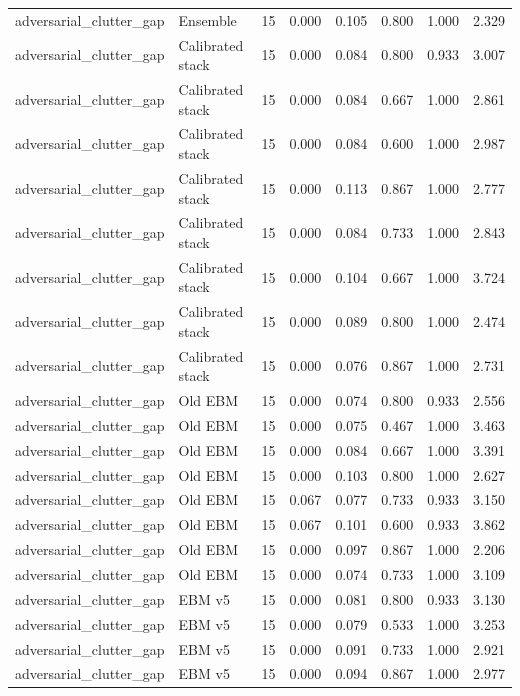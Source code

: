 {\begin{longtable}{llrrrrrr}
adversarial\_clutter\_gap & Ensemble & 15 & 0.000 & 0.105 & 0.800 & 1.000 & 2.329 \\
adversarial\_clutter\_gap & Calibrated stack & 15 & 0.000 & 0.084 & 0.800 & 0.933 & 3.007 \\
adversarial\_clutter\_gap & Calibrated stack & 15 & 0.000 & 0.084 & 0.667 & 1.000 & 2.861 \\
adversarial\_clutter\_gap & Calibrated stack & 15 & 0.000 & 0.084 & 0.600 & 1.000 & 2.987 \\
adversarial\_clutter\_gap & Calibrated stack & 15 & 0.000 & 0.113 & 0.867 & 1.000 & 2.777 \\
adversarial\_clutter\_gap & Calibrated stack & 15 & 0.000 & 0.084 & 0.733 & 1.000 & 2.843 \\
adversarial\_clutter\_gap & Calibrated stack & 15 & 0.000 & 0.104 & 0.667 & 1.000 & 3.724 \\
adversarial\_clutter\_gap & Calibrated stack & 15 & 0.000 & 0.089 & 0.800 & 1.000 & 2.474 \\
adversarial\_clutter\_gap & Calibrated stack & 15 & 0.000 & 0.076 & 0.867 & 1.000 & 2.731 \\
adversarial\_clutter\_gap & Old EBM & 15 & 0.000 & 0.074 & 0.800 & 0.933 & 2.556 \\
adversarial\_clutter\_gap & Old EBM & 15 & 0.000 & 0.075 & 0.467 & 1.000 & 3.463 \\
adversarial\_clutter\_gap & Old EBM & 15 & 0.000 & 0.084 & 0.667 & 1.000 & 3.391 \\
adversarial\_clutter\_gap & Old EBM & 15 & 0.000 & 0.103 & 0.800 & 1.000 & 2.627 \\
adversarial\_clutter\_gap & Old EBM & 15 & 0.067 & 0.077 & 0.733 & 0.933 & 3.150 \\
adversarial\_clutter\_gap & Old EBM & 15 & 0.067 & 0.101 & 0.600 & 0.933 & 3.862 \\
adversarial\_clutter\_gap & Old EBM & 15 & 0.000 & 0.097 & 0.867 & 1.000 & 2.206 \\
adversarial\_clutter\_gap & Old EBM & 15 & 0.000 & 0.074 & 0.733 & 1.000 & 3.109 \\
adversarial\_clutter\_gap & EBM v5 & 15 & 0.000 & 0.081 & 0.800 & 0.933 & 3.130 \\
adversarial\_clutter\_gap & EBM v5 & 15 & 0.000 & 0.079 & 0.533 & 1.000 & 3.253 \\
adversarial\_clutter\_gap & EBM v5 & 15 & 0.000 & 0.091 & 0.733 & 1.000 & 2.921 \\
adversarial\_clutter\_gap & EBM v5 & 15 & 0.000 & 0.094 & 0.867 & 1.000 & 2.977 \\

\end{longtable}}
